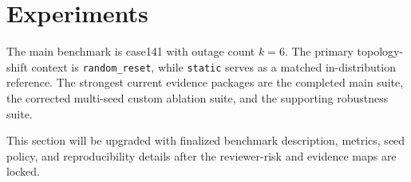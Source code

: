 \section{Experiments}

The main benchmark is case141 with outage count $k=6$. The primary topology-shift context is \texttt{random\_reset}, while \texttt{static} serves as a matched in-distribution reference. The strongest current evidence packages are the completed main suite, the corrected multi-seed custom ablation suite, and the supporting robustness suite.

This section will be upgraded with finalized benchmark description, metrics, seed policy, and reproducibility details after the reviewer-risk and evidence maps are locked.
